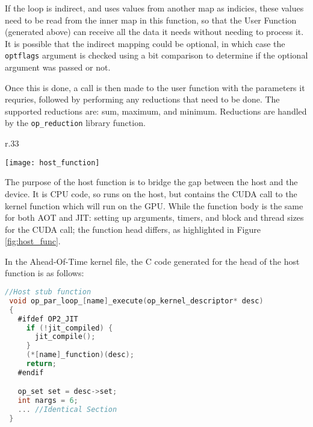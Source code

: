 If the loop is indirect, and uses values from another map as indicies, these values need to be read from the inner map in this function, so that the User Function (generated above) can receive all the data it needs without needing to process it. It is possible that the indirect mapping could be optional, in which case the \verb|optflags| argument is checked using a bit comparison to determine if the optional argument was passed or not.
\par
Once this is done, a call is then made to the user function with the parameters it requries, followed by performing any reductions that need to be done. The supported reductions are: sum, maximum, and minimum\cite[p11]{manual}. Reductions are handled by the \verb|op_reduction| library function.

\begin{wrapfigure}[8]{r}{.33\textwidth}
  \centering
  \caption{Host Function}
  \label{fig:host_func}
  \texttt{[image: host\_function]}
\end{wrapfigure}
The purpose of the host function is to bridge the gap between the host and the device. It is CPU code, so runs on the host, but contains the CUDA call to the kernel function which will run on the GPU. While the function body is the same for both AOT and JIT: setting up arguments, timers, and block and thread sizes for the CUDA call; the function head differs, as highlighted in Figure \ref{fig:host_func}.
\vspace{\parskip}

In the Ahead-Of-Time kernel file, the C code generated for the head of the host function is as follows:

\begin{lstlisting}[linewidth = \textwidth, framesep=0pt, language=C, linebackgroundcolor={\ifnum\value{lstnumber}<15 \ifnum\value{lstnumber}>10 \color{red!20} \else \color{blue!20} \fi \else \color{blue!20} \fi}]
 //Host stub function
 void op_par_loop_[name]_execute(op_kernel_descriptor* desc)
 {
   #ifdef OP2_JIT
     if (!jit_compiled) {
       jit_compile();
     }
     (*[name]_function)(desc);
     return;
   #endif

   op_set set = desc->set;
   int nargs = 6;
   ... //Identical Section
 }
\end{lstlisting}


